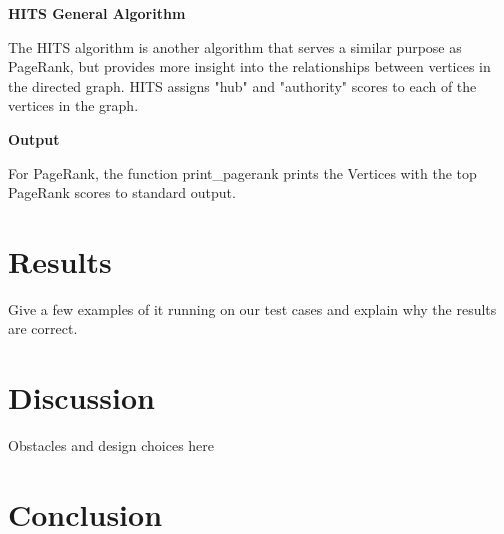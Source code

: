 \documentclass[12pt, titlepage, twoside]{amsart}
\theoremstyle{remark}
\begin{document}
\textbf{HITS General Algorithm}

The HITS algorithm is another algorithm that serves a similar purpose as PageRank, but provides more insight into the relationships between vertices in the directed graph. HITS assigns "hub" and "authority" scores to each of the vertices in the graph.


\textbf{Output}

For PageRank, the function print\_pagerank prints the Vertices with the top PageRank scores to standard output.

\section{Results}

Give a few examples of it running on our test cases and explain why the results are correct.

\section{Discussion}

Obstacles and design choices here

\section{Conclusion}
\end{document}
